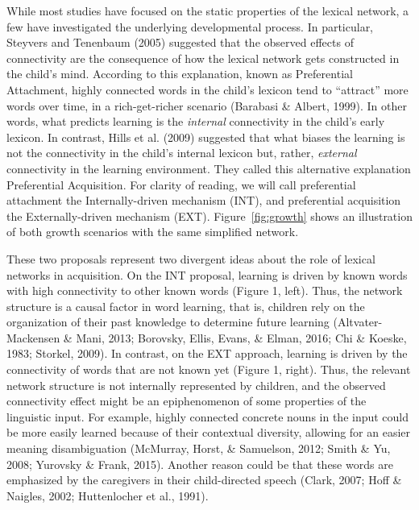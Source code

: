 \documentclass[english,floatsintext,man]{apa6}
\theoremstyle{definition}
\theoremstyle{definition}
\theoremstyle{definition}
\theoremstyle{remark}
\begin{document}
While most studies have focused on the static properties of the lexical
network, a few have investigated the underlying developmental process.
In particular, Steyvers and Tenenbaum (2005) suggested that the observed
effects of connectivity are the consequence of how the lexical network
gets constructed in the child's mind. According to this explanation,
known as Preferential Attachment, highly connected words in the child's
lexicon tend to \enquote{attract} more words over time, in a
rich-get-richer scenario (Barabasi \& Albert, 1999). In other words,
what predicts learning is the \emph{internal} connectivity in the
child's early lexicon. In contrast, Hills et al. (2009) suggested that
what biases the learning is not the connectivity in the child's internal
lexicon but, rather, \emph{external} connectivity in the learning
environment. They called this alternative explanation Preferential
Acquisition. For clarity of reading, we will call preferential
attachment the Internally-driven mechanism (INT), and preferential
acquisition the Externally-driven mechanism (EXT).
Figure~\ref{fig:growth} shows an illustration of both growth scenarios
with the same simplified network.

These two proposals represent two divergent ideas about the role of
lexical networks in acquisition. On the INT proposal, learning is driven
by known words with high connectivity to other known words (Figure 1,
left). Thus, the network structure is a causal factor in word learning,
that is, children rely on the organization of their past knowledge to
determine future learning (Altvater-Mackensen \& Mani, 2013; Borovsky,
Ellis, Evans, \& Elman, 2016; Chi \& Koeske, 1983; Storkel, 2009). In
contrast, on the EXT approach, learning is driven by the connectivity of
words that are not known yet (Figure 1, right). Thus, the relevant
network structure is not internally represented by children, and the
observed connectivity effect might be an epiphenomenon of some
properties of the linguistic input. For example, highly connected
concrete nouns in the input could be more easily learned because of
their contextual diversity, allowing for an easier meaning
disambiguation (McMurray, Horst, \& Samuelson, 2012; Smith \& Yu, 2008;
Yurovsky \& Frank, 2015). Another reason could be that these words are
emphasized by the caregivers in their child-directed speech (Clark,
2007; Hoff \& Naigles, 2002; Huttenlocher et al., 1991).
\end{document}

